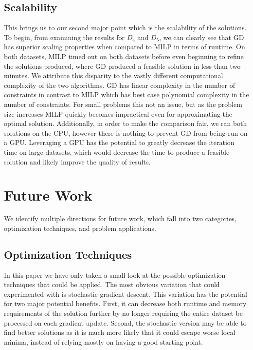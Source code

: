 \documentclass[a4paper]{article}
\begin{document}
\subsection{Scalability}

This brings us to our second major point which is the scalability of the 
solutions. To begin, from examining the results for $D_4$ and $D_5$, we can clearly see that 
GD has superior scaling properties when compared to MILP in terms of 
runtime. On both datasets, MILP timed out on both datasets before even beginning to refine the 
solutions produced, where GD produced a feasible solution in less than two minutes.
We attribute this disparity to the vastly different computational complexity of the 
two algorithms. GD has linear complexity in the number of constraints in contrast to
MILP which has best case polynomial complexity in the number of constraints.  For small 
problems this not an issue, but as the problem size increases MILP quickly becomes
impractical even for approximating the optimal solution. Additionally, in order to 
make the comparison fair, we ran both solutions on the CPU, however there is nothing 
to prevent GD from being run on a GPU. Leveraging a GPU has the potential to greatly decrease the 
iteration time on large datasets, which would decrease the time to produce a feasible solution 
and likely improve the quality of results.

\section{Future Work}

We identify multiple directions for future work, which fall into 
two categories, optimization techniques, and problem applications. 

\subsection{Optimization Techniques}

In this paper we have only taken a small look at the possible optimization
techniques that could be applied. The most obvious variation that could experimented with
is stochastic gradient descent. This variation has the potential for two major
potential benefits. First, it can decrease both runtime and memory requirements
of the solution further by no longer requiring the entire dataset be processed
on each gradient update. Second, the stochastic version may be able to find
better solutions as it is much more likely that it could escape worse local
minima, instead of relying mostly on having a good starting point.
\end{document}
